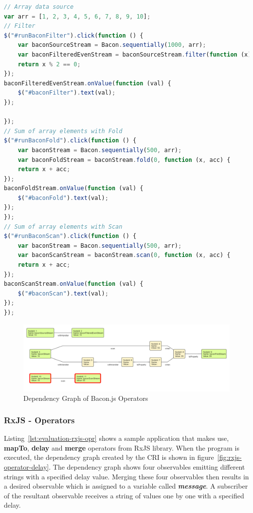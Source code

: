 \begin{lstlisting}[language=JavaScript, caption=Understanding Bacon.js Operators, label={lst:evaluation-bacon-opr}]
// Array data source
var arr = [1, 2, 3, 4, 5, 6, 7, 8, 9, 10];
// Filter
$("#runBaconFilter").click(function () {
	var baconSourceStream = Bacon.sequentially(1000, arr);
	var baconFilteredEvenStream = baconSourceStream.filter(function (x) {
	return x % 2 == 0;
});
baconFilteredEvenStream.onValue(function (val) {
	$("#baconFilter").text(val);
});

});
// Sum of array elements with Fold
$("#runBaconFold").click(function () {
	var baconStream = Bacon.sequentially(500, arr);
	var baconFoldStream = baconStream.fold(0, function (x, acc) {
	return x + acc;
});
baconFoldStream.onValue(function (val) {
	$("#baconFold").text(val);
});
});
// Sum of array elements with Scan
$("#runBaconScan").click(function () {
	var baconStream = Bacon.sequentially(500, arr);
	var baconScanStream = baconStream.scan(0, function (x, acc) {
	return x + acc;
});
baconScanStream.onValue(function (val) {
	$("#baconScan").text(val);
});
});
\end{lstlisting}



\begin{figure}[!h]
	\centering
	\includegraphics[width=\textwidth,height=\textheight,keepaspectratio]{gfx/evaluation/dg_bacon-operators.png}
	\caption{Dependency Graph of Bacon.js Operators}
	\label{fig:bacon-operators-dg-with-ui}
\end{figure}


\subsubsection{RxJS - Operators}
Listing~\ref{lst:evaluation-rxjs-opr} shows a sample application that makes use, \textbf{mapTo}, \textbf{delay} and \textbf{merge} operators from RxJS library. When the program is executed, the dependency graph created by the CRI is shown in figure~\ref{fig:rxjs-operator-delay}. The dependency graph shows four observables emitting different strings with a specified delay value. Merging these four observables then results in a desired observable which is assigned to a variable called \textbf{\textit{message}}. A subscriber of the resultant observable receives a string of values one by one with a specified delay.


